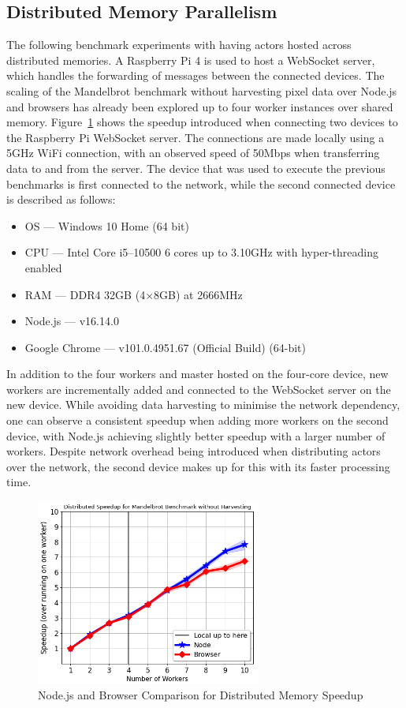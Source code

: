 \documentclass[oneside]{um-fict}
\begin{document}
\subsection{Distributed Memory Parallelism}
The following benchmark experiments with having actors hosted across distributed memories. A Raspberry Pi 4 is used to host a WebSocket server, which handles the forwarding of messages between the connected devices. The scaling of the Mandelbrot benchmark without harvesting pixel data over Node.js and browsers has already been explored up to four worker instances over shared memory. Figure~\ref{fig:distributed_memory_speedup} shows the speedup introduced when connecting two devices to the Raspberry Pi WebSocket server. The connections are made locally using a 5GHz WiFi connection, with an observed speed of 50Mbps when transferring data to and from the server. The device that was used to execute the previous benchmarks is first connected to the network, while the second connected device is described as follows: 
\begin{itemize}
    \item OS --- Windows 10 Home (64 bit)
    \item CPU --- Intel Core i5--10500 6 cores up to 3.10GHz with hyper-threading enabled
    \item RAM --- DDR4 32GB (4$\times$8GB) at 2666MHz
    \item Node.js --- v16.14.0
    \item Google Chrome --- v101.0.4951.67 (Official Build) (64-bit)
\end{itemize}
In addition to the four workers and master hosted on the four-core device, new workers are incrementally added and connected to the WebSocket server on the new device. While avoiding data harvesting to minimise the network dependency, one can observe a consistent speedup when adding more workers on the second device, with Node.js achieving slightly better speedup with a larger number of workers. Despite network overhead being introduced when distributing actors over the network, the second device makes up for this with its faster processing time.
\begin{figure}[H]
    \begin{centering}
        \includegraphics[width=280px]{resources/distributed_memory_speedup.png}
        \caption{Node.js and Browser Comparison for Distributed Memory Speedup}\label{fig:distributed_memory_speedup}
    \end{centering}
\end{figure}
\end{document}
